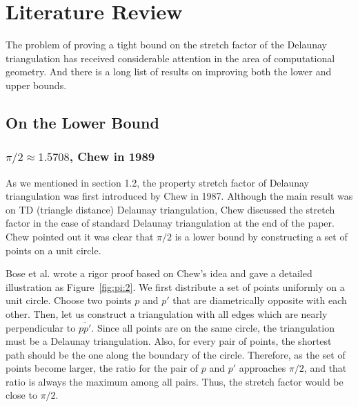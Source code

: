 \chapter{Literature Review}
The problem of proving a tight bound on the stretch factor of the Delaunay triangulation has received considerable attention in the area of computational geometry. And there is a long list of results on improving both the lower and upper bounds.


\section{On the Lower Bound}

\subsection{\texorpdfstring{$\pi/2\approx 1.5708$}     {Lg}, Chew in 1989}

As we mentioned in section 1.2, the property stretch factor of Delaunay triangulation was first introduced by Chew\cite{chew} in 1987. Although the main result was on TD (triangle distance) Delaunay triangulation, Chew discussed the stretch factor in the case of standard Delaunay triangulation at the end of the paper. Chew pointed out it was clear that $\pi/2$ is a lower bound by constructing a set of points on a unit circle. 

Bose et al.\cite{BoseCGTA} wrote a rigor proof based on Chew's idea and gave a detailed illustration as Figure~\ref{fig:pi:2}. We first distribute a set of points uniformly on a unit circle. Choose two points $p$ and $p'$ that are diametrically opposite with each other. Then, let us construct a triangulation with all edges which are nearly perpendicular to $\overline{pp'}$. Since all points are on the same circle, the triangulation must be a Delaunay triangulation. Also, for every pair of points, the shortest path should be the one along the boundary of the circle. Therefore, as the set of points become larger, the ratio for the pair of $p$ and $p'$ approaches $\pi/2$, and that ratio is always the maximum among all pairs. Thus, the stretch factor would be close to $\pi/2$.

